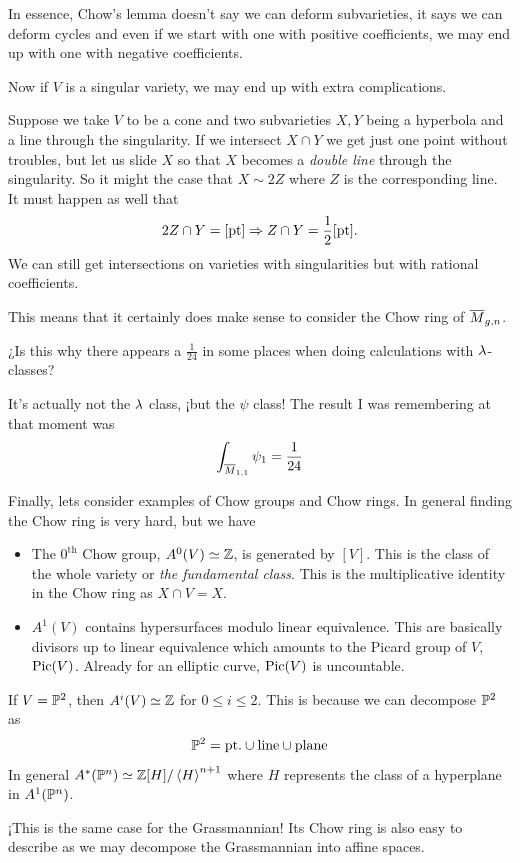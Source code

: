 \documentclass[12pt]{memoir}
\begin{document}
In essence, Chow's lemma doesn't say we can deform subvarieties, it says we can deform cycles and even if we start with one with positive coefficients, we may end up with one with negative coefficients.\par 

Now if $V$ is a singular variety, we may end up with extra complications.

\begin{Ex}
    Suppose we take $V$ to be a cone and two subvarieties $X,Y$ being a hyperbola and a line through the singularity.
    If we intersect $X\cap Y$ we get just one point without troubles, but let us slide $X$ so that $X$ becomes a \emph{double line} through the singularity. So it might the case that $X\sim 2Z$ where $Z$ is the corresponding line. It must happen as well that 
    $$2Z\cap Y=[\text{pt}]\To Z\cap Y =\half[\text{pt}].$$
    We can still get intersections on varieties with singularities but with rational coefficients.
\end{Ex}

This means that it certainly does make sense to consider the Chow ring of $\overline{M}_{g,n}$.

\begin{Qn}
¿Is this why there appears a $\frac{1}{24}$ in some places when doing calculations with $\lambda$-classes?
\end{Qn}

\begin{ptcb}[RQ 241212]
    It's actually not the $\lambda$ class, ¡but the $\psi$ class! The result I was remembering at that moment was 
    $$\int_{\overline M_{1,1}}\psi_1=\frac{1}{24}$$
\end{ptcb}

Finally, lets consider examples of Chow groups and Chow rings. In general finding the Chow ring is very hard, but we have
\begin{itemize}
    \item The $0^{\text{th}}$ Chow group, $A^0(V)\simeq\mathbb{Z}$, is generated by $[V]$. This is the class of the whole variety or \emph{the fundamental class}. This is the multiplicative identity in the Chow ring as $X\cap V=X$. 
    \item $A^1(V)$ contains hypersurfaces modulo linear equivalence. This are basically divisors up to linear equivalence which amounts to the Picard group of $V$, $\operatorname{Pic}(V)$. Already for an elliptic curve, $\operatorname{Pic}(V)$ is uncountable.
\end{itemize}

\begin{Ex}
    If $V=\mathbb{P}^2$, then $A^{i}(V)\simeq\mathbb{Z}$ for $0\leq i\leq 2$. This is because we can decompose $\mathbb{P}^2$ as 
    $$\mathbb{P}^2=\text{pt.}\cup\text{line}\cup\text{plane}$$
    In general $A^\ast(\mathbb{P}^n)\simeq\mathbb{Z}[H]/\left\langle H\right\rangle^{n+1}$ where $H$ represents the class of a hyperplane in $A^1(\mathbb{P}^n)$.\par
    ¡This is the same case for the Grassmannian! Its Chow ring is also easy to describe as we may decompose the Grassmannian into affine spaces.
\end{Ex}
\end{document}
